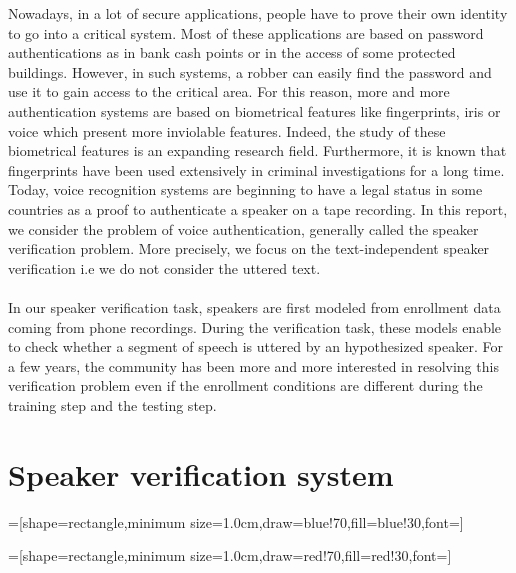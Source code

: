 \documentclass{techrep} %
\begin{document}
Nowadays, in a lot of secure applications, people have to prove their
own identity to go into a critical system. Most of these applications
are based on password authentications as in bank cash points or in the
access of some protected buildings. However, in such systems, a robber
can easily find the password and use it to gain access to the critical
area. For this reason, more and more authentication systems are based
on biometrical features like fingerprints, iris or voice which present
more inviolable features. Indeed, the study of these biometrical
features is an expanding research field. Furthermore, it is known that
fingerprints have been used extensively in criminal investigations for
a long time. Today, voice recognition systems are beginning to have a
legal status in some countries as a proof to authenticate a speaker on
a tape recording.  In this report, we consider the problem of voice
authentication, generally called the speaker verification
problem. More precisely, we focus on the text-independent speaker
verification i.e we do not consider the uttered text.\\\\ In our
speaker verification task, speakers are first modeled from enrollment
data coming from phone recordings. During the verification task, these
models enable to check whether a segment of speech is uttered by an
hypothesized speaker. For a few years, the community has been more and
more interested in resolving this verification problem even if the
enrollment conditions are different during the training step and the
testing step.

\section{Speaker verification system}

=[shape=rectangle,minimum
  size=1.0cm,draw=blue!70,fill=blue!30,font=\small]

=[shape=rectangle,minimum
  size=1.0cm,draw=red!70,fill=red!30,font=\small]

\begin{center}
\end{center}
\end{document}
